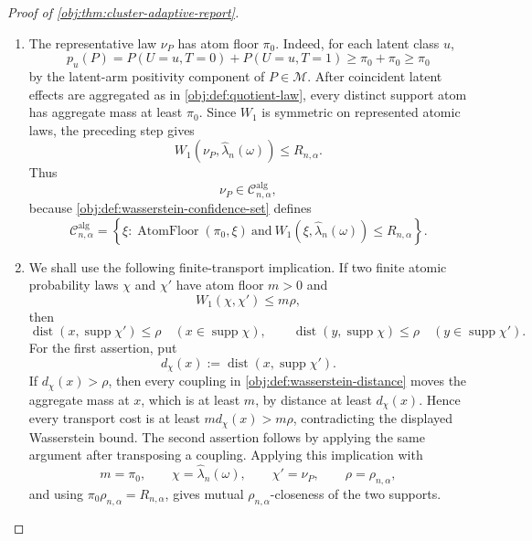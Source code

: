 \begin{proof}[Proof of \cref{obj:thm:cluster-adaptive-report}]
\begin{enumerate}
\item The representative law \(\nu_P\) has atom floor \(\pi_0\).  Indeed, for
each latent class \(u\),
\[
p_u(P)=P(U=u,T=0)+P(U=u,T=1)\ge \pi_0+\pi_0\ge\pi_0
\]
by the latent-arm positivity component of \(P\in\mathcal M\).  After coincident
latent effects are aggregated as in \cref{obj:def:quotient-law}, every distinct
support atom has aggregate mass at least \(\pi_0\).  Since \(W_1\) is symmetric
on represented atomic laws, the preceding step gives
\[
W_1(\nu_P,\widehat\lambda_n(\omega))\le R_{n,\alpha}.
\]
Thus
\[
\nu_P\in\mathcal C^{\mathrm{alg}}_{n,\alpha},
\]
because \cref{obj:def:wasserstein-confidence-set} defines
\[
\mathcal C^{\mathrm{alg}}_{n,\alpha}
=
\left\{
\xi:
\operatorname{AtomFloor}(\pi_0,\xi)
\ \text{and}\
W_1(\xi,\widehat\lambda_n(\omega))\le R_{n,\alpha}
\right\}. %
\]

\item We shall use the following finite-transport implication.  If two finite
atomic probability laws \(\chi\) and \(\chi'\) have atom floor \(m>0\) and
\[
W_1(\chi,\chi')\le m\rho ,
\]
then
\[
\operatorname{dist}(x,\operatorname{supp}\chi')\le\rho
\quad(x\in\operatorname{supp}\chi),
\qquad
\operatorname{dist}(y,\operatorname{supp}\chi)\le\rho
\quad(y\in\operatorname{supp}\chi').
\]
For the first assertion, put
\[
d_\chi(x):=\operatorname{dist}(x,\operatorname{supp}\chi').
\]
If \(d_\chi(x)>\rho\), then every coupling in
\cref{obj:def:wasserstein-distance} moves the aggregate mass at \(x\), which is
at least \(m\), by distance at least \(d_\chi(x)\).  Hence every transport cost
is at least \(m d_\chi(x)>m\rho\), contradicting the displayed Wasserstein
bound.  The second assertion follows by applying the same argument after
transposing a coupling.  Applying this implication with
\[
m=\pi_0,\qquad
\chi=\widehat\lambda_n(\omega),\qquad
\chi'=\nu_P,\qquad
\rho=\rho_{n,\alpha},
\]
and using \(\pi_0\rho_{n,\alpha}=R_{n,\alpha}\), gives mutual
\(\rho_{n,\alpha}\)-closeness of the two supports. %


\end{enumerate}
\end{proof}
